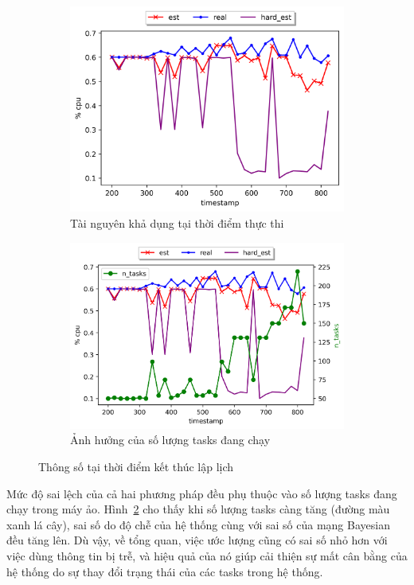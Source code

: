\documentclass{my_style}
\begin{document}
\begin{figure}[t]
\centering
\begin{subfigure}{.5\textwidth}
  \centering
  \includegraphics[width=.85\linewidth]{images/cpu_usage_estimation_1.png}
  \caption{Tài nguyên khả dụng tại thời điểm thực thi}
  \label{fig:usage_est_a}
\end{subfigure}%
\begin{subfigure}{.5\textwidth}
  \centering
  \includegraphics[width=.9\linewidth]{images/cpu_usage_estimation_2.png}
  \caption{Ảnh hưởng của số lượng tasks đang chạy}
  \label{fig:usage_est_b}
\end{subfigure}
\caption{Thông số tại thời điểm kết thúc lập lịch}
\label{fig:usage_est}
\end{figure}

\noindent
Mức độ sai lệch của cả hai phương pháp đều phụ thuộc vào số lượng tasks đang chạy trong máy ảo. Hình~\ref{fig:usage_est_b} cho thấy khi số lượng tasks càng tăng (đường màu xanh lá cây), sai số do độ chễ của hệ thống cùng với sai số của mạng Bayesian đều tăng lên. Dù vậy, về tổng quan, việc ước lượng cũng có sai số nhỏ hơn với việc dùng thông tin bị trễ, và hiệu quả của nó giúp cải thiện sự mất cân bằng của hệ thống do sự thay đổi trạng thái của các tasks trong hệ thống. 
\end{document}
